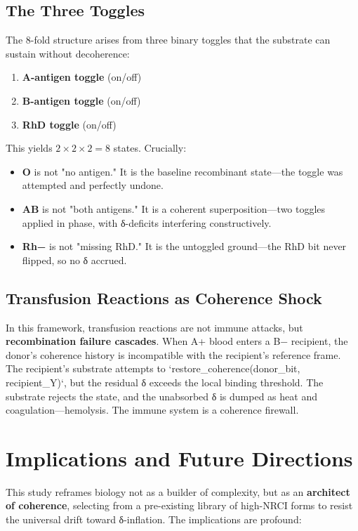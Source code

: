 \documentclass[11pt]{article}
\begin{document}
\subsection{The Three Toggles}

The 8-fold structure arises from three binary toggles that the substrate can sustain without decoherence:

\begin{enumerate}
    \item \textbf{A-antigen toggle} (on/off)
    \item \textbf{B-antigen toggle} (on/off)
    \item \textbf{RhD toggle} (on/off)
\end{enumerate}

This yields $2 \times 2 \times 2 = 8$ states. Crucially:

\begin{itemize}
    \item \textbf{O} is not "no antigen." It is the baseline recombinant state—the toggle was attempted and perfectly undone.
    \item \textbf{AB} is not "both antigens." It is a coherent superposition—two toggles applied in phase, with δ-deficits interfering constructively.
    \item \textbf{Rh−} is not "missing RhD." It is the untoggled ground—the RhD bit never flipped, so no δ accrued.
\end{itemize}

\subsection{Transfusion Reactions as Coherence Shock}

In this framework, transfusion reactions are not immune attacks, but \textbf{recombination failure cascades}. When A+ blood enters a B− recipient, the donor's coherence history is incompatible with the recipient's reference frame. The recipient's substrate attempts to `restore_coherence(donor_bit, recipient_Y)`, but the residual δ exceeds the local binding threshold. The substrate rejects the state, and the unabsorbed δ is dumped as heat and coagulation—hemolysis. The immune system is a coherence firewall.

\section{Implications and Future Directions}

This study reframes biology not as a builder of complexity, but as an \textbf{architect of coherence}, selecting from a pre-existing library of high-NRCI forms to resist the universal drift toward δ-inflation. The implications are profound:
\end{document}
